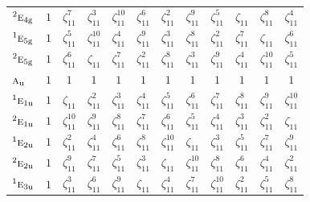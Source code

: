 \documentclass[10pt,a4paper]{article}
\numberwithin{equation}{section}
\newcommand{\irr}[1]{\text{\normalfont\scshape #1}}
\newcommand{\conjpair}[1]{{}^{#1}}
\newcommand{\ptag}[1]{\mathrm{#1}}
\newcommand{\rootunity}[1]{\zeta_{#1}}
\begin{document}
{\begin{longtable}{@{}lccccccccccc@{}}
$\conjpair{2}\irr{e}_{4\ptag{g}}$ & $1$ & $\rootunity{11}^{7}$ & $\rootunity{11}^{3}$ & $\rootunity{11}^{10}$ & $\rootunity{11}^{6}$ & $\rootunity{11}^{2}$ & $\rootunity{11}^{9}$ & $\rootunity{11}^{5}$ & $\rootunity{11}$ & $\rootunity{11}^{8}$ & $\rootunity{11}^{4}$\\
$\conjpair{1}\irr{e}_{5\ptag{g}}$ & $1$ & $\rootunity{11}^{5}$ & $\rootunity{11}^{10}$ & $\rootunity{11}^{4}$ & $\rootunity{11}^{9}$ & $\rootunity{11}^{3}$ & $\rootunity{11}^{8}$ & $\rootunity{11}^{2}$ & $\rootunity{11}^{7}$ & $\rootunity{11}$ & $\rootunity{11}^{6}$\\
$\conjpair{2}\irr{e}_{5\ptag{g}}$ & $1$ & $\rootunity{11}^{6}$ & $\rootunity{11}$ & $\rootunity{11}^{7}$ & $\rootunity{11}^{2}$ & $\rootunity{11}^{8}$ & $\rootunity{11}^{3}$ & $\rootunity{11}^{9}$ & $\rootunity{11}^{4}$ & $\rootunity{11}^{10}$ & $\rootunity{11}^{5}$\\
$\irr{a}_{\ptag{u}}$ & $1$ & $1$ & $1$ & $1$ & $1$ & $1$ & $1$ & $1$ & $1$ & $1$ & $1$\\
$\conjpair{1}\irr{e}_{1\ptag{u}}$ & $1$ & $\rootunity{11}$ & $\rootunity{11}^{2}$ & $\rootunity{11}^{3}$ & $\rootunity{11}^{4}$ & $\rootunity{11}^{5}$ & $\rootunity{11}^{6}$ & $\rootunity{11}^{7}$ & $\rootunity{11}^{8}$ & $\rootunity{11}^{9}$ & $\rootunity{11}^{10}$\\
$\conjpair{2}\irr{e}_{1\ptag{u}}$ & $1$ & $\rootunity{11}^{10}$ & $\rootunity{11}^{9}$ & $\rootunity{11}^{8}$ & $\rootunity{11}^{7}$ & $\rootunity{11}^{6}$ & $\rootunity{11}^{5}$ & $\rootunity{11}^{4}$ & $\rootunity{11}^{3}$ & $\rootunity{11}^{2}$ & $\rootunity{11}$\\
$\conjpair{1}\irr{e}_{2\ptag{u}}$ & $1$ & $\rootunity{11}^{2}$ & $\rootunity{11}^{4}$ & $\rootunity{11}^{6}$ & $\rootunity{11}^{8}$ & $\rootunity{11}^{10}$ & $\rootunity{11}$ & $\rootunity{11}^{3}$ & $\rootunity{11}^{5}$ & $\rootunity{11}^{7}$ & $\rootunity{11}^{9}$\\
$\conjpair{2}\irr{e}_{2\ptag{u}}$ & $1$ & $\rootunity{11}^{9}$ & $\rootunity{11}^{7}$ & $\rootunity{11}^{5}$ & $\rootunity{11}^{3}$ & $\rootunity{11}$ & $\rootunity{11}^{10}$ & $\rootunity{11}^{8}$ & $\rootunity{11}^{6}$ & $\rootunity{11}^{4}$ & $\rootunity{11}^{2}$\\
$\conjpair{1}\irr{e}_{3\ptag{u}}$ & $1$ & $\rootunity{11}^{3}$ & $\rootunity{11}^{6}$ & $\rootunity{11}^{9}$ & $\rootunity{11}$ & $\rootunity{11}^{4}$ & $\rootunity{11}^{7}$ & $\rootunity{11}^{10}$ & $\rootunity{11}^{2}$ & $\rootunity{11}^{5}$ & $\rootunity{11}^{8}$\\

\end{longtable}}
\end{document}
